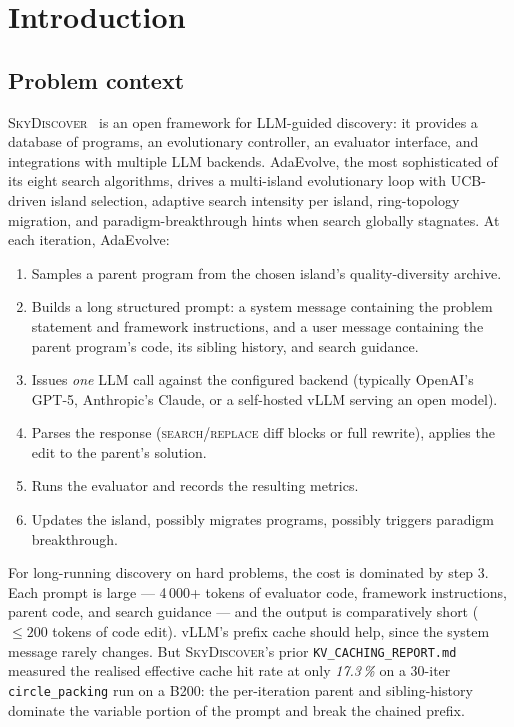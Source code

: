 \documentclass[11pt]{article}
\newcommand{\skyd}{\textsc{SkyDiscover}}
\newcommand{\adaev}{AdaEvolve}
\begin{document}
\tableofcontents
\vspace{1em}

\section{Introduction}
\label{sec:intro}

\subsection{Problem context}

\skyd{}~\cite{skydiscover2026} is an open framework for LLM-guided
discovery: it provides a database of programs, an evolutionary
controller, an evaluator interface, and integrations with multiple
LLM backends. \adaev{}, the most sophisticated of its eight search
algorithms, drives a multi-island evolutionary loop with UCB-driven
island selection, adaptive search intensity per island, ring-topology
migration, and paradigm-breakthrough hints when search globally
stagnates. At each iteration, \adaev{}:

\begin{enumerate}
\item Samples a parent program from the chosen island's
  quality-diversity archive.
\item Builds a long structured prompt: a system message containing
  the problem statement and framework instructions, and a user message
  containing the parent program's code, its sibling history, and
  search guidance.
\item Issues \emph{one} LLM call against the configured backend
  (typically OpenAI's GPT-5, Anthropic's Claude, or a self-hosted
  vLLM serving an open model).
\item Parses the response (\textsc{search}/\textsc{replace} diff
  blocks or full rewrite), applies the edit to the parent's solution.
\item Runs the evaluator and records the resulting metrics.
\item Updates the island, possibly migrates programs, possibly
  triggers paradigm breakthrough.
\end{enumerate}

For long-running discovery on hard problems, the cost is dominated by
step 3. Each prompt is large --- 4\,000+ tokens of evaluator code,
framework instructions, parent code, and search guidance --- and the
output is comparatively short ($\le 200$ tokens of code edit). vLLM's
prefix cache should help, since the system message rarely changes.
But \skyd{}'s prior \texttt{KV\_CACHING\_REPORT.md} measured the
realised effective cache hit rate at only \emph{17.3\,\%} on a 30-iter
\texttt{circle\_packing} run on a B200: the per-iteration parent and
sibling-history dominate the variable portion of the prompt and break
the chained prefix.
\end{document}
